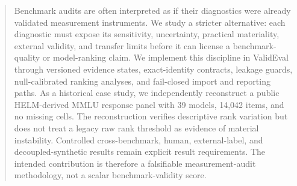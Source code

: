 \begin{abstract}
Benchmark audits are often interpreted as if their diagnostics were already validated measurement
instruments. We study a stricter alternative: each diagnostic must expose its sensitivity,
uncertainty, practical materiality, external validity, and transfer limits before it can license a
benchmark-quality or model-ranking claim. We implement this discipline in ValidEval through
versioned evidence states, exact-identity contracts, leakage guards, null-calibrated ranking
analyses, and fail-closed import and reporting paths. As a historical case study, we independently
reconstruct a public HELM-derived MMLU response panel with 39 models, 14,042 items, and no missing
cells. The reconstruction verifies descriptive rank variation but does not treat a legacy raw rank
threshold as evidence of material instability. Controlled cross-benchmark, human, external-label,
and decoupled-synthetic results remain explicit result requirements. The intended contribution is
therefore a falsifiable measurement-audit methodology, not a scalar benchmark-validity score.
\end{abstract}
